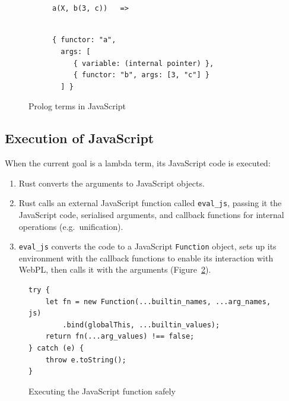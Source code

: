 \begin{figure}[H]
\centering
\begin{subfigure}{0.3\textwidth}
\centering
\begin{verbatim}


a(X, b(3, c))   =>


\end{verbatim}
\end{subfigure}%
\begin{subfigure}{0.7\textwidth}
\centering
\begin{verbatim}
{ functor: "a",
  args: [
     { variable: (internal pointer) },
     { functor: "b", args: [3, "c"] }
  ] }
\end{verbatim}
\end{subfigure}
\caption{Prolog terms in JavaScript}
\label{fig:prolog-js-mapping}
\end{figure}

\subsection{Execution of JavaScript}

When the current goal is a lambda term, its JavaScript code is executed:

\begin{enumerate}
\item Rust converts the arguments to JavaScript objects.
\item Rust calls an external JavaScript function called \texttt{eval\_js}, passing it the JavaScript code, serialised arguments, and callback functions for internal operations (e.g.\ unification).
\item \texttt{eval\_js} converts the code to a JavaScript \texttt{Function} object, sets up its environment with the callback functions to enable its interaction with WebPL, then calls it with the arguments (Figure~\ref{fig:js-execution}).
\end{enumerate}

\begin{figure}[H]
\centering
\begin{verbatim}
try {
    let fn = new Function(...builtin_names, ...arg_names, js)
        .bind(globalThis, ...builtin_values);
    return fn(...arg_values) !== false;
} catch (e) {
    throw e.toString();
}
\end{verbatim}
\caption{Executing the JavaScript function safely}
\label{fig:js-execution}
\end{figure}

